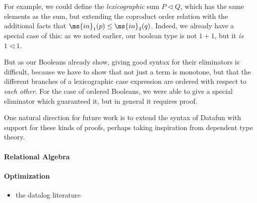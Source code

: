 For example, we could define the \emph{lexicographic} sum $P \lhd Q$,
which has the same elements as the sum, but extending the coproduct order
relation with the additional
facts that $\ms{in}_1(p) \leq \ms{in}_2(q)$. Indeed, we already have a
special case of this: as we noted earlier, our boolean type is not $1
+ 1$, but it \emph{is} $1 \lhd 1$.

But as our Booleans already show, giving good syntax for their
eliminators is difficult, because we have to show that not just a term
is monotone, but that the different branches of a lexicographic case
expression are ordered with respect to \emph{each other}. For the case
of ordered Booleans, we were able to give a special eliminator which
guaranteed it, but in general it requires proof.

One natural direction for future work is to extend the syntax of
Datafun with support for these kinds of proofs, perhaps taking
inspiration from dependent type theory.

\paragraph{Relational Algebra}

\paragraph{Optimization}
\begin{itemize}
\item \TODO the datalog literature
\end{itemize}

